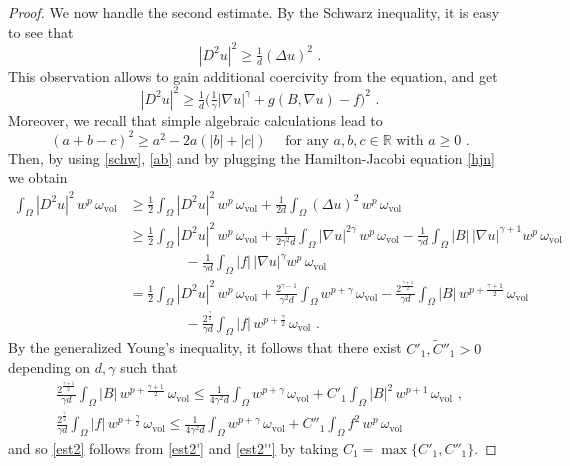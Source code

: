 \documentclass[10pt, a4paper, reqno, oneside]{amsart}
\theoremstyle{plain}
\theoremstyle{definition}
\theoremstyle{plain}
\theoremstyle{definition}
\theoremstyle{plain}
\renewcommand{\=}{:=}
\begin{document}
\begin{proof}
We now handle the second estimate. By the Schwarz inequality, it is easy to see that
\begin{equation} \label{schw}
|D^2u|^2 \geq \tfrac1d (\Delta u)^2 \,\, .
\end{equation}
This observation allows to gain additional coercivity from the equation, and get
$$
|D^2u|^2 \geq \tfrac1d \big(\tfrac1{\gamma}|\nabla u|^\gamma +g(B,\nabla u)-f \big)^2 \,\, .
$$
Moreover, we recall that simple algebraic calculations lead to
\begin{equation} \label{ab}
(a+b-c)^2\geq a^2 -2a(|b|+|c|) \quad \text{ for any $a,b,c \in \mathbb{R}$ with $a\geq0$} \,\, .
\end{equation}
Then, by using \eqref{schw}, \eqref{ab} and by plugging the Hamilton-Jacobi equation \eqref{hjn} we obtain
\begin{equation} \label{est2'} \begin{aligned}
\int_\Omega |D^2u|^2\,w^p\,\omega_{\mathrm{vol}} &\geq \tfrac12\int_\Omega |D^2u|^2\,w^p\,\omega_{\mathrm{vol}} +\tfrac1{2d}\int_\Omega (\Delta u)^2\,w^p\,\omega_{\mathrm{vol}} \\
&\geq \tfrac12\int_\Omega |D^2u|^2\,w^p\,\omega_{\mathrm{vol}}
+\tfrac1{2\gamma^2d}\int_\Omega |\nabla u|^{2\gamma}\,w^p\,\omega_{\mathrm{vol}} -\tfrac1{\gamma d}\int_\Omega |B|\,|\nabla u|^{\gamma+1}w^p\,\omega_{\mathrm{vol}} \\
&\qquad \qquad -\tfrac1{\gamma d}\int_\Omega |f|\,|\nabla u|^{\gamma}w^p\,\omega_{\mathrm{vol}} \\
&= \tfrac12\int_\Omega |D^2u|^2\,w^p\,\omega_{\mathrm{vol}} +\tfrac{2^{\gamma-1}}{\gamma^2d}\int_\Omega w^{p+\gamma}\,\omega_{\mathrm{vol}}
-\tfrac{2^{\frac{\gamma+1}2}}{\gamma d} \int_\Omega |B|\,w^{p+\frac{\gamma+1}2}\,\omega_{\mathrm{vol}} \\
&\qquad \qquad -\tfrac{2^{\frac\gamma2}}{\gamma d} \int_\Omega |f|\,w^{p+\frac{\gamma}2}\,\omega_{\mathrm{vol}} \,\, .
\end{aligned} \end{equation}
By the generalized Young's inequality, it follows that there exist $C'_1,\tilde C''_1>0$ depending on $d,\gamma$ such that
\begin{equation} \label{est2''} \begin{gathered}
\tfrac{2^{\frac{\gamma+1}2}}{\gamma d} \int_\Omega |B|\,w^{p+\frac{\gamma+1}2}\,\omega_{\mathrm{vol}} \leq
\tfrac{1}{4\gamma^2d}\int_\Omega w^{p+\gamma}\,\omega_{\mathrm{vol}}
+ C'_1 \int_\Omega |B|^2\,w^{p+1}\,\omega_{\mathrm{vol}} \,\, , \\
\tfrac{2^{\frac\gamma2}}{\gamma d} \int_\Omega |f|\,w^{p+\frac{\gamma}2}\,\omega_{\mathrm{vol}} \leq
\tfrac{1}{4\gamma^2d}\int_\Omega w^{p+\gamma}\,\omega_{\mathrm{vol}}
+ C''_1 \int_\Omega f^2\,w^{p}\,\omega_{\mathrm{vol}}
\end{gathered} \end{equation}
and so \eqref{est2} follows from \eqref{est2'} and \eqref{est2''} by taking $C_1=\max\{ C'_1, C''_1\}$.
\end{proof}
\end{document}
